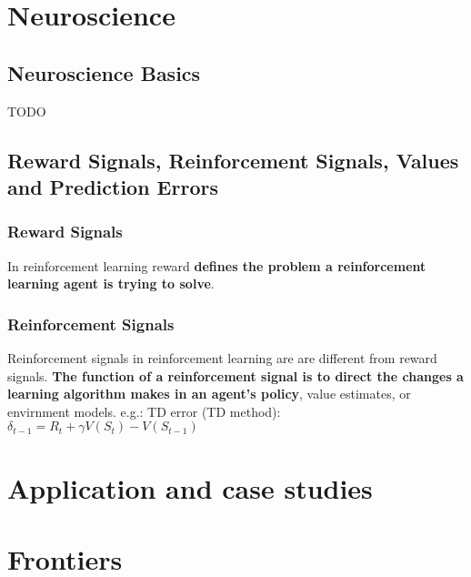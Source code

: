 \documentclass[10pt, landscape, a4paper]{article}
\begin{document}
\begin{multicols}{3}
        \section{Neuroscience}

        \subsection{Neuroscience Basics}
        TODO

        \subsection{Reward Signals, Reinforcement Signals, Values and Prediction Errors}

        \subsubsection{Reward Signals}
        In reinforcement learning reward \textbf{defines the problem a reinforcement learning agent is trying to solve}.

        \subsubsection{Reinforcement Signals}
        Reinforcement signals in reinforcement learning are are different from reward signals.
        \textbf{The function of a reinforcement signal is to direct the changes a learning algorithm makes in an agent's policy}, value estimates, or envirnment models.
        e.g.:
        TD error (TD method):
        $\delta_{t-1}=R_t+\gamma V(S_t)-V(S_{t-1})$


        \section{Application and case studies}


        \section{Frontiers}
    \end{multicols}
\end{document}
